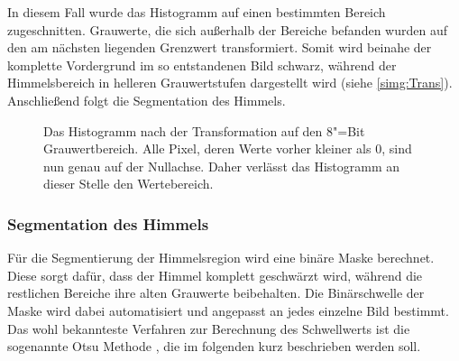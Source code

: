 \documentclass[12pt,a4paper,titlepage]{scrartcl}
\begin{document}
In diesem Fall wurde das Histogramm auf einen bestimmten Bereich zugeschnitten. Grauwerte, die sich außerhalb der Bereiche befanden wurden auf den am nächsten liegenden Grenzwert transformiert. Somit wird beinahe der komplette Vordergrund im so entstandenen Bild schwarz, während der Himmelsbereich in helleren Grauwertstufen dargestellt wird (siehe \autoref{simg:Trans}). Anschließend folgt die Segmentation des Himmels.

\begin{figure}[h!]
\centering
\resizebox{0.9\textwidth}{6cm}{}
\caption[Histogrammtransformation]{Das Histogramm nach der Transformation auf den 8"=Bit Grauwertbereich. Alle Pixel, deren Werte vorher kleiner als $0$, sind nun genau auf der Nullachse. Daher verlässt das Histogramm an dieser Stelle den Wertebereich.}\label{img:Hist_cut}
\end{figure} 
\subsubsection{Segmentation des Himmels}
Für die Segmentierung der Himmelsregion wird eine binäre Maske berechnet. Diese sorgt dafür, dass der Himmel komplett geschwärzt wird, während die restlichen Bereiche ihre alten Grauwerte beibehalten. Die Binärschwelle der Maske wird dabei automatisiert und angepasst an jedes einzelne Bild bestimmt. Das wohl bekannteste Verfahren zur Berechnung des Schwellwerts ist die sogenannte Otsu Methode \cite{otsu1975threshold}, die im folgenden kurz beschrieben werden soll.
\end{document}
